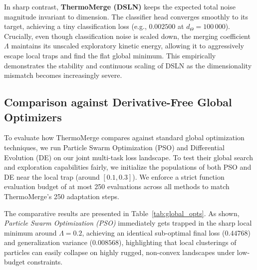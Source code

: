 In sharp contrast, \textbf{ThermoMerge (DSLN)} keeps the expected total noise magnitude invariant to dimension.
The classifier head converges smoothly to its target, achieving a tiny classification loss (e.g., $0.002500$ at $d_{\Theta} = 100\,000$).
Crucially, even though classification noise is scaled down, the merging coefficient $\Lambda$ maintains its unscaled exploratory kinetic energy, allowing it to aggressively escape local traps and find the flat global minimum.
This empirically demonstrates the stability and continuous scaling of DSLN as the dimensionality mismatch becomes increasingly severe.

\subsection{Comparison against Derivative-Free Global Optimizers}
\label{sec:global_optimizers_exp}
To evaluate how ThermoMerge compares against standard global optimization techniques, we run Particle Swarm Optimization (PSO) and Differential Evolution (DE) on our joint multi-task loss landscape.
To test their global search and exploration capabilities fairly, we initialize the populations of both PSO and DE near the local trap (around $[0.1, 0.3]$).
We enforce a strict function evaluation budget of at most 250 evaluations across all methods to match ThermoMerge's 250 adaptation steps.

The comparative results are presented in Table~\ref{tab:global_opts}.
As shown, \emph{Particle Swarm Optimization (PSO)} immediately gets trapped in the sharp local minimum around $\Lambda = 0.2$, achieving an identical sub-optimal final loss ($0.44768$) and generalization variance ($0.008568$), highlighting that local clusterings of particles can easily collapse on highly rugged, non-convex landscapes under low-budget constraints.

